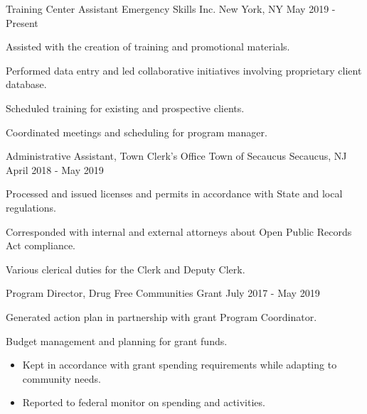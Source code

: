 

\begin{cventries}

  \cventry
    {Training Center Assistant} %
    {Emergency Skills Inc.} %
    {New York, NY} %
    {May 2019 - Present} %
    {
      \begin{cvitems} %
        \item {Assisted with the creation of training and promotional materials.}
        \item {Performed data entry and led collaborative initiatives involving proprietary client database.}
        \item {Scheduled training for existing and prospective clients.}
        \item {Coordinated meetings and scheduling for program manager.}
      \end{cvitems}
    }

  \cventry
    {Administrative Assistant, Town Clerk’s Office} %
    {Town of Secaucus} %
    {Secaucus, NJ} %
    {April 2018 - May 2019} %
    {
      \begin{cvitems} %
        \item {Processed and issued licenses and permits in accordance with State and local regulations.}
        \item {Corresponded with internal and external attorneys about Open Public Records Act compliance.}
        \item {Various clerical duties for the Clerk and Deputy Clerk.}
      \end{cvitems}
    }

  \cventry
    {Program Director, Drug Free Communities Grant} %
    {} %
    {} %
    {July 2017 - May 2019} %
    {
      \begin{cvitems} %
        \item {Generated action plan in partnership with grant Program Coordinator.}
        \item {Budget management and planning for grant funds.}
        \begin{itemize}
          \item {Kept in accordance with grant spending requirements while adapting to community needs.}
          \item {Reported to federal monitor on spending and activities.}
        \end{itemize}
      \end{cvitems}
    }


\end{cventries}
